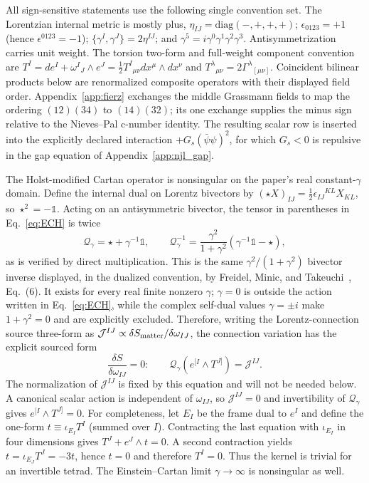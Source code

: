 \documentclass[aps,prd,twocolumn,superscriptaddress,preprintnumbers,nofootinbib,longbibliography,floatfix]{revtex4-2}
\begin{document}
All sign-sensitive statements use the following single convention set.
The Lorentzian internal metric is mostly plus,
$\eta_{IJ}=\mathrm{diag}(-,+,+,+)$; $\epsilon_{0123}=+1$ (hence
$\epsilon^{0123}=-1$); $\{\gamma^I,\gamma^J\}=2\eta^{IJ}$; and
$\gamma^5=i\gamma^0\gamma^1\gamma^2\gamma^3$.  Antisymmetrization carries
unit weight.  The torsion two-form and full-weight component convention are
$T^I=de^I+\omega^I{}_J\wedge e^J
=\tfrac12T^I{}_{\mu\nu}dx^\mu\wedge dx^\nu$ and
$T^\lambda{}_{\mu\nu}=2\Gamma^\lambda{}_{[\mu\nu]}$.  Coincident bilinear
products below are renormalized composite operators with their displayed
field order.  Appendix~\ref{app:fierz} exchanges the middle Grassmann fields
to map the ordering $(12)(34)$ to $(14)(32)$; its one exchange supplies the
minus sign relative to the Nieves--Pal c-number identity.  The resulting
scalar row is inserted into the explicitly declared interaction
$+G_s(\bar\psi\psi)^2$, for which $G_s<0$ is repulsive in the gap equation of
Appendix~\ref{app:njl_gap}.

The Holst-modified Cartan operator is nonsingular on the paper's real
constant-$\gamma$ domain.  Define the internal dual on Lorentz bivectors by
$(\star X)_{IJ}=\tfrac12\epsilon_{IJ}{}^{KL}X_{KL}$, so
$\star^2=-\mathbb 1$.  Acting on an antisymmetric bivector, the tensor in
parentheses in Eq.~\eqref{eq:ECH} is twice
\begin{equation}\label{eq:holst_cartan_inverse}
\mathcal Q_\gamma=\star+\gamma^{-1}\mathbb 1,\qquad
\mathcal Q_\gamma^{-1}
=\frac{\gamma^2}{1+\gamma^2}
\left(\gamma^{-1}\mathbb 1-\star\right),
\end{equation}
as is verified by direct multiplication.  This is the same
$\gamma^2/(1+\gamma^2)$ bivector inverse displayed, in the dualized
convention, by Freidel, Minic, and Takeuchi~\cite{Freidel2005}, Eq.~(6).
It exists for every real finite nonzero $\gamma$; $\gamma=0$ is outside the
action written in Eq.~\eqref{eq:ECH}, while the complex self-dual values
$\gamma=\pm i$ make $1+\gamma^2=0$ and are explicitly excluded.  Therefore,
writing the Lorentz-connection source three-form as
$\mathcal J^{IJ}\propto\delta S_{\rm matter}/\delta\omega_{IJ}$, the
connection variation has the explicit sourced form
\begin{equation}\label{eq:cartan_source}
\frac{\delta S}{\delta\omega_{IJ}}=0:\qquad
\mathcal Q_\gamma\!\left(e^{[I}\wedge T^{J]}\right)=\mathcal J^{IJ}.
\end{equation}
The normalization of $\mathcal J^{IJ}$ is fixed by this equation and will not
be needed below.  A canonical scalar action is independent of
$\omega_{IJ}$, so $\mathcal J^{IJ}=0$ and invertibility of
$\mathcal Q_\gamma$ gives $e^{[I}\wedge T^{J]}=0$.
For completeness, let $E_I$ be the frame dual to $e^I$ and define the one-form
$t\equiv\iota_{E_I}T^I$ (summed over $I$).  Contracting the last equation with
$\iota_{E_I}$ in four dimensions gives
$T^J+e^J\wedge t=0$.  A second contraction yields
$t=\iota_{E_J}T^J=-3t$, hence $t=0$ and therefore $T^I=0$.  Thus the kernel is
trivial for an invertible tetrad.  The Einstein--Cartan limit
$\gamma\to\infty$ is nonsingular as well.
\end{document}
